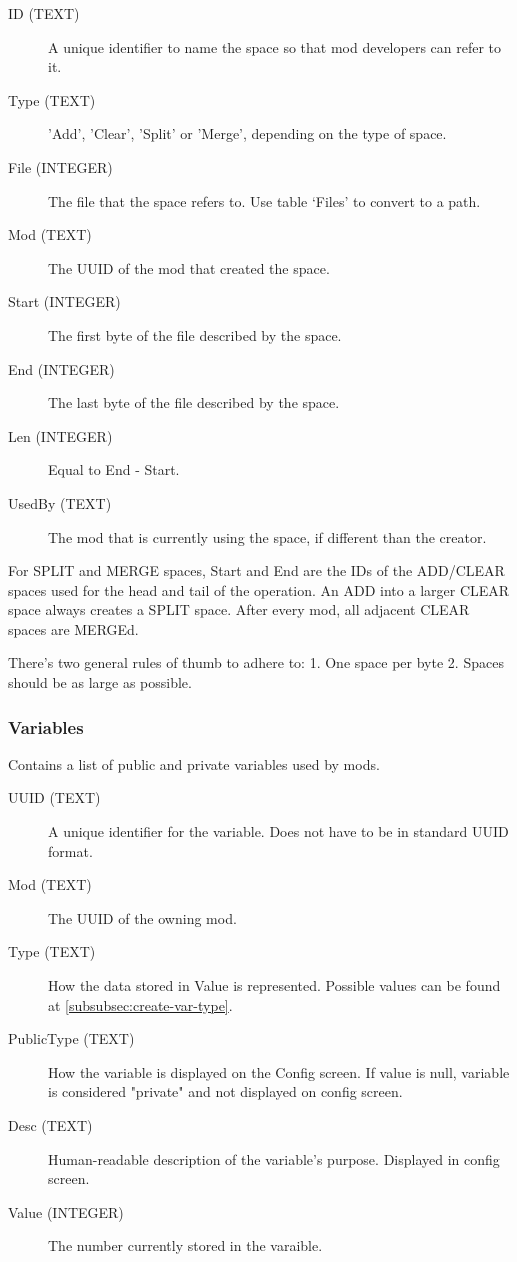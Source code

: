 \begin{description}
\item[ID (TEXT)] A unique identifier to name the space so that mod developers can refer to it.
\item[Type (TEXT)] 'Add', 'Clear', 'Split' or 'Merge', depending on the type of space.
\item[File (INTEGER)] The file that the space refers to. Use table `Files' to convert to a path.
\item[Mod (TEXT)] The UUID of the mod that created the space.
\item[Start (INTEGER)] The first byte of the file described by the space.
\item[End (INTEGER)] The last byte of the file described by the space.
\item[Len (INTEGER)] Equal to End - Start.
\item[UsedBy (TEXT)] The mod that is currently using the space, if different than the creator.
\end{description}

For SPLIT and MERGE spaces, Start and End are the IDs of the ADD/CLEAR spaces used for the head and tail of the operation.
An ADD into a larger CLEAR space always creates a SPLIT space.
After every mod, all adjacent CLEAR spaces are MERGEd.

There's two general rules of thumb to adhere to:
1. One space per byte
2. Spaces should be as large as possible.

\subsubsection{Variables}
Contains a list of public and private variables used by mods.

\begin{description}
\item[UUID (TEXT)] A unique identifier for the variable. Does not have to be in standard UUID format.
\item[Mod (TEXT)] The UUID of the owning mod.
\item[Type (TEXT)] How the data stored in Value is represented. Possible values can be found at \ref{subsubsec:create-var-type}.
\item[PublicType (TEXT)] How the variable is displayed on the Config screen. If value is null, variable is considered "private" and not displayed on config screen. 
\item[Desc (TEXT)] Human-readable description of the variable's purpose. Displayed in config screen.	
\item[Value (INTEGER)] The number currently stored in the varaible.

\end{description}

